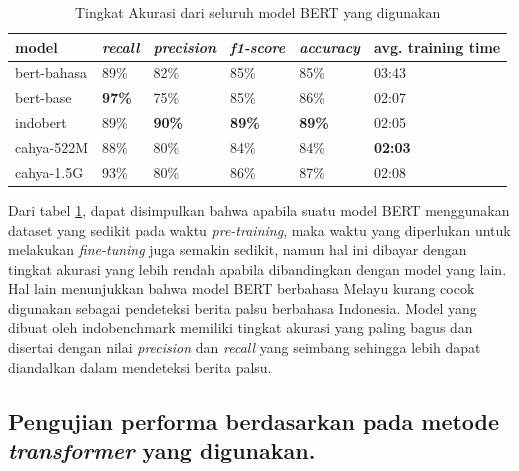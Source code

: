 \begin{table}[h]
    \centering
    \caption{Tingkat Akurasi dari seluruh model BERT yang digunakan}
    \label{tab:model_bert_result}
    \begin{tabular}{|l|l|l|l|l|p{.12\linewidth}|}
        \hline
        \textbf{model} & \textit{\textbf{recall}} & \textit{\textbf{precision}} & \textit{\textbf{f1-score}} & \textit{\textbf{accuracy}} & \textbf{avg. training time} \\ \hline
        bert-bahasa    & 89\%                     & 82\%                        & 85\%                       & 85\%                       & 03:43                       \\ \hline
        bert-base      & \textbf{97\%}            & 75\%                        & 85\%                       & 86\%                       & 02:07                       \\ \hline
        indobert       & 89\%                     & \textbf{90\%}               & \textbf{89\%}              & \textbf{89\%}              & 02:05                       \\ \hline
        cahya-522M     & 88\%                     & 80\%                        & 84\%                       & 84\%                       & \textbf{02:03}              \\ \hline
        cahya-1.5G     & 93\%                     & 80\%                        & 86\%                       & 87\%                       & 02:08                       \\ \hline
    \end{tabular}
\end{table}

Dari tabel \ref{tab:model_bert_result}, dapat disimpulkan bahwa apabila suatu model BERT menggunakan dataset yang sedikit pada waktu \textit{pre-training}, maka waktu yang diperlukan untuk melakukan \textit{fine-tuning} juga semakin sedikit, namun hal ini dibayar dengan tingkat akurasi yang lebih rendah apabila dibandingkan dengan model yang lain. Hal lain menunjukkan bahwa model BERT berbahasa Melayu kurang cocok digunakan sebagai pendeteksi berita palsu berbahasa Indonesia. Model yang dibuat oleh indobenchmark memiliki tingkat akurasi yang paling bagus dan disertai dengan nilai \textit{precision} dan \textit{recall} yang seimbang sehingga lebih dapat diandalkan dalam mendeteksi berita palsu.

\subsection{Pengujian performa berdasarkan pada metode \textit{transformer} yang digunakan.}

